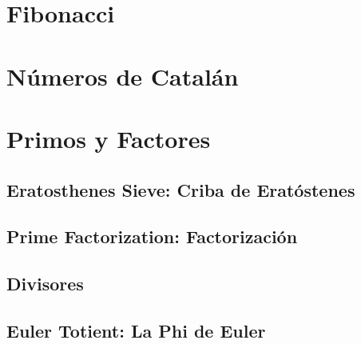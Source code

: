 \documentclass[12pt, fleqn]{report}                             %
\theoremstyle{break}                                            %
\begin{document}
        \section{Fibonacci}

        \section{Números de Catalán}

        \section{Primos y Factores}

            \subsection{Eratosthenes Sieve: Criba de Eratóstenes}

            \subsection{Prime Factorization: Factorización}

            \subsection{Divisores}

            \subsection{Euler Totient: La Phi de Euler}
\end{document}
